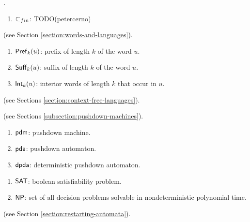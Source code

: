 
.

\begin{enumerate}[]
\item $\subset_{fin}$: TODO(petercerno)
\end{enumerate}

 (see Section \ref{section:words-and-languages}).

\begin{enumerate}[]
\item $\textup{\sf Pref\/}_k(u)$: prefix of length $k$ of the word $u$.
\item $\textup{\sf Suff\/}_k(u)$: suffix of length $k$ of the word $u$.
\item $\textup{\sf Int\/}_k(u)$: interior words of length $k$ that occur in $u$.
\end{enumerate}

 (see Sections \ref{section:context-free-languages}).

 (see Sections \ref{subsection:pushdown-machines}).

\begin{enumerate}[]
\item $\textup{\sf pdm}$: pushdown machine.
\item $\textup{\sf pda}$: pushdown automaton.
\item $\textup{\sf dpda}$: deterministic pushdown automaton.
\end{enumerate}


\begin{enumerate}[]
\item $\textup{\sf SAT}$: boolean satisfiability problem.
\item $\textup{\sf NP}$: set of all decision problems solvable in nondeterministic polynomial time.
\end{enumerate}

 (see Section \ref{section:restarting-automata}).

